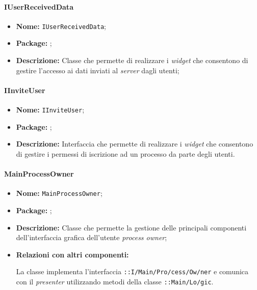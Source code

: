 \paragraph{IUserReceivedData}
\begin{itemize}
\item \textbf{Nome:} \texttt{IUserReceivedData};
\item \textbf{Package:} \texttt{\iViewAdmin{}};
\item \textbf{Descrizione:} Classe che permette di realizzare i \textit{widget} che consentono di gestire l'accesso ai dati inviati al \textit{server} dagli utenti;
\end{itemize}

\paragraph{IInviteUser}
\begin{itemize}
\item \textbf{Nome:} \texttt{IInviteUser};
\item \textbf{Package:} \texttt{\iViewAdmin{}};
\item \textbf{Descrizione:} Interfaccia che permette di realizzare i \textit{widget} che consentono di gestire i permessi di iscrizione ad un processo da parte degli utenti.
\end{itemize}
\paragraph{MainProcessOwner}
\begin{flushleft}
\begin{itemize}
\item \textbf{Nome:} \texttt{MainProcessOwner};
\item \textbf{Package:} \texttt{\viewAdmin{}};
\item \textbf{Descrizione:} Classe che permette la gestione delle principali componenti dell'interfaccia grafica dell'utente \textit{process owner};
\item \textbf{Relazioni con altri componenti:}
\begin{sloppypar}
La classe implementa l'interfaccia \texttt{\iViewAdmin{}::I\fshyp{}Main\fshyp{}Pro\fshyp{}cess\fshyp{}Ow\fshyp{}ner} e comunica con il \textit{presenter} utilizzando metodi della classe \texttt{\logicAdmin{}::Main\fshyp{}Lo\fshyp{}gic}.
\end{sloppypar}
\end{itemize}
\end{flushleft}

